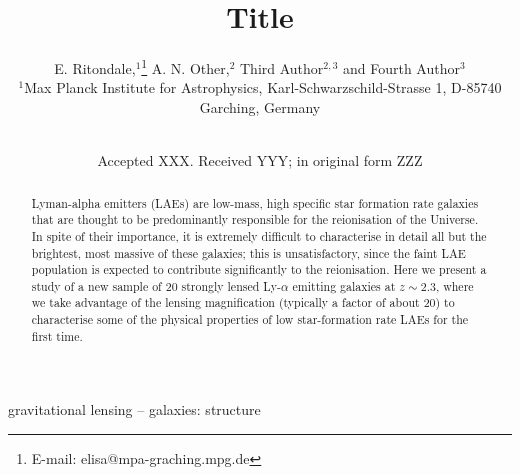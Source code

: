 \documentclass[a4paper,fleqn,usenatbib]{mnras}
\title[Short title]{Title}
\author[E. Ritondale et al.]{
E. Ritondale,$^{1}$\thanks{E-mail: elisa@mpa-graching.mpg.de}
A. N. Other,$^{2}$
Third Author$^{2,3}$
and Fourth Author$^{3}$
\\
$^{1}$Max Planck Institute for Astrophysics, Karl-Schwarzschild-Strasse 1, D-85740 Garching, Germany\\\\
}
\date{Accepted XXX. Received YYY; in original form ZZZ}
\begin{document}
\label{firstpage}
\pagerange{\pageref{firstpage}--\pageref{lastpage}}
\maketitle

\label{firstpage}

\begin{abstract}
Lyman-alpha emitters (LAEs) are low-mass, high specific star formation rate galaxies that are thought to be predominantly responsible for the reionisation of the Universe. In spite of their importance, it is extremely difficult to characterise in detail all but the brightest, most massive of these galaxies; this is unsatisfactory, since the faint LAE population is expected to contribute significantly to the reionisation. Here we present a study of a new sample of 20 strongly lensed Ly-$\alpha$ emitting galaxies at $z \sim 2.3$, where we take advantage of the lensing magnification (typically a factor of  about 20) to characterise some of the physical properties of low star-formation rate LAEs for the first time.

\end{abstract}
\begin{keywords}
gravitational lensing -- galaxies: structure 
\end{keywords}
\end{document}
